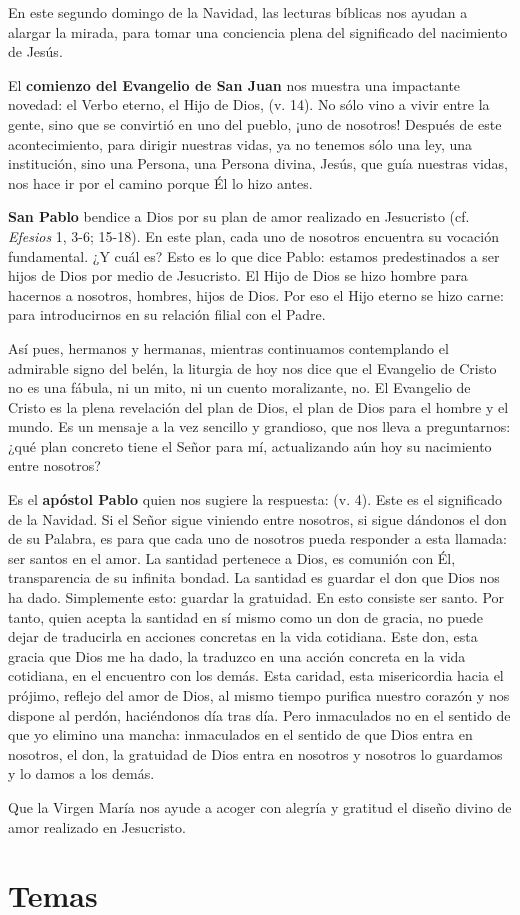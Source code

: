 				\begin{body}
					En este segundo domingo de la Navidad, las lecturas bíblicas nos ayudan a alargar la mirada, para tomar una conciencia plena del significado del nacimiento de Jesús.
					
					El \textbf{comienzo del Evangelio de San Juan} nos muestra una impactante novedad: el Verbo eterno, el Hijo de Dios,  (v. 14). No sólo vino a vivir entre la gente, sino que se convirtió en uno del pueblo, ¡uno de nosotros! Después de este acontecimiento, para dirigir nuestras vidas, ya no tenemos sólo una ley, una institución, sino una Persona, una Persona divina, Jesús, que guía nuestras vidas, nos hace ir por el camino porque Él lo hizo antes.
					
					\textbf{San Pablo} bendice a Dios por su plan de amor realizado en Jesucristo (cf. \emph{Efesios} 1, 3-6; 15-18). En este plan, cada uno de nosotros encuentra su vocación fundamental. ¿Y cuál es? Esto es lo que dice Pablo: estamos predestinados a ser hijos de Dios por medio de Jesucristo. El Hijo de Dios se hizo hombre para hacernos a nosotros, hombres, hijos de Dios. Por eso el Hijo eterno se hizo carne: para introducirnos en su relación filial con el Padre.
					
					Así pues, hermanos y hermanas, mientras continuamos contemplando el admirable signo del belén, la liturgia de hoy nos dice que el Evangelio de Cristo no es una fábula, ni un mito, ni un cuento moralizante, no. El Evangelio de Cristo es la plena revelación del plan de Dios, el plan de Dios para el hombre y el mundo. Es un mensaje a la vez sencillo y grandioso, que nos lleva a preguntarnos: ¿qué plan concreto tiene el Señor para mí, actualizando aún hoy su nacimiento entre nosotros?
					
					Es el \textbf{apóstol Pablo} quien nos sugiere la respuesta:  (v. 4). Este es el significado de la Navidad. Si el Señor sigue viniendo entre nosotros, si sigue dándonos el don de su Palabra, es para que cada uno de nosotros pueda responder a esta llamada: ser santos en el amor. La santidad pertenece a Dios, es comunión con Él, transparencia de su infinita bondad. La santidad es guardar el don que Dios nos ha dado. Simplemente esto: guardar la gratuidad. En esto consiste ser santo. Por tanto, quien acepta la santidad en sí mismo como un don de gracia, no puede dejar de traducirla en acciones concretas en la vida cotidiana. Este don, esta gracia que Dios me ha dado, la traduzco en una acción concreta en la vida cotidiana, en el encuentro con los demás. Esta caridad, esta misericordia hacia el prójimo, reflejo del amor de Dios, al mismo tiempo purifica nuestro corazón y nos dispone al perdón, haciéndonos  día tras día. Pero inmaculados no en el sentido de que yo elimino una mancha: inmaculados en el sentido de que Dios entra en nosotros, el don, la gratuidad de Dios entra en nosotros y nosotros lo guardamos y lo damos a los demás.
					
					Que la Virgen María nos ayude a acoger con alegría y gratitud el diseño divino de amor realizado en Jesucristo.
				\end{body}

\newsection

	\section{Temas}